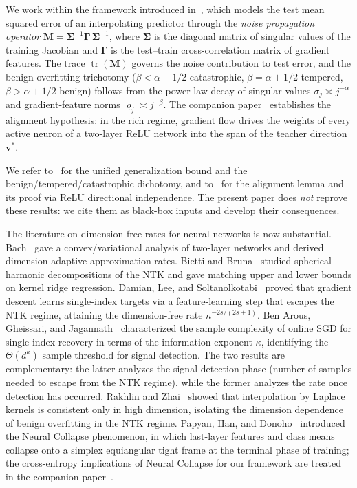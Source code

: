 \documentclass[12pt]{amsart}
\theoremstyle{definition}
\theoremstyle{remark}
\DeclareMathOperator{\tr}{tr}
\newcommand{\bM}{\mathbf{M}}
\newcommand{\bv}{\mathbf{v}}
\newcommand{\bSigma}{\boldsymbol{\Sigma}}
\newcommand{\bGamma}{\boldsymbol{\Gamma}}
\begin{document}
We work within the framework introduced in~\cite{paperA}, which models the
test mean squared error of an interpolating predictor through the
\emph{noise propagation operator} $\bM = \bSigma^{-1} \bGamma\, \bSigma^{-1}$,
where $\bSigma$ is the diagonal matrix of singular values of the training
Jacobian and $\bGamma$ is the test--train cross-correlation matrix of
gradient features. The trace $\tr(\bM)$ governs the noise contribution to
test error, and the benign overfitting trichotomy
($\beta < \alpha + 1/2$ catastrophic, $\beta = \alpha + 1/2$ tempered,
$\beta > \alpha + 1/2$ benign) follows from the power-law decay of singular
values $\sigma_{j} \asymp j^{-\alpha}$ and gradient-feature norms
$\varrho_{j} \asymp j^{-\beta}$. The companion paper~\cite{paperB} establishes
the alignment hypothesis: in the rich regime, gradient flow drives the
weights of every active neuron of a two-layer ReLU network into the span of
the teacher direction $\bv^{*}$.

We refer to~\cite{paperA} for the unified generalization bound and the
benign/tempered/catastrophic dichotomy, and to~\cite{paperB} for the
alignment lemma and its proof via ReLU directional independence. The
present paper does \emph{not} reprove these results: we cite them as
black-box inputs and develop their consequences.

The literature on dimension-free rates for neural networks is now
substantial. Bach~\cite{Bach2017} gave a convex/variational analysis of two-layer
networks and derived dimension-adaptive approximation rates. Bietti and
Bruna~\cite{BiettiBruna2021} studied spherical harmonic decompositions of
the NTK and gave matching upper and lower bounds on kernel ridge regression.
Damian, Lee, and Soltanolkotabi~\cite{DLS2022} proved that gradient
descent learns single-index targets via a feature-learning step that
escapes the NTK regime, attaining the dimension-free rate
$n^{-2s/(2s+1)}$.
Ben Arous, Gheissari, and Jagannath~\cite{BenArous2021} characterized
the sample complexity of online SGD for single-index recovery in terms
of the information exponent $\kappa$, identifying the $\Theta(d^{\kappa})$
sample threshold for signal detection. The two results are complementary:
the latter analyzes the signal-detection phase (number of samples needed
to escape from the NTK regime), while the former analyzes the rate
once detection has occurred.
Rakhlin and Zhai~\cite{RZ2019} showed that interpolation by Laplace kernels
is consistent only in high dimension, isolating the dimension dependence of
benign overfitting in the NTK regime. Papyan, Han, and
Donoho~\cite{papyan2020} introduced the Neural Collapse phenomenon, in
which last-layer features and class means collapse onto a simplex
equiangular tight frame at the terminal phase of training; the
cross-entropy implications of Neural Collapse for our framework are
treated in the companion paper~\cite{paperD}.
\end{document}
